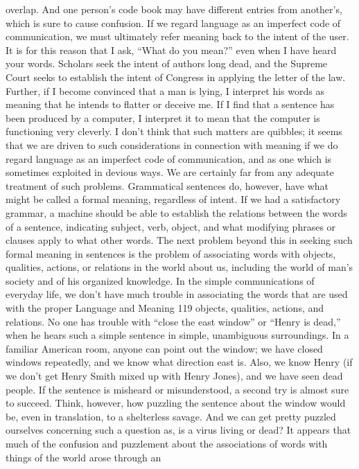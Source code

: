 {{{overlap. And one person’s code book may have different entries
from another’s, which is sure to cause confusion.
If we regard language as an imperfect code of communication,
we must ultimately refer meaning back to the intent of the user.
It is for this reason that I ask, “What do you mean?” even when I
have heard your words. Scholars seek the intent of authors long
dead, and the Supreme Court seeks to establish the intent of Congress
in applying the letter of the law.
Further, if I become convinced that a man is lying, I interpret
his words as meaning that he intends to flatter or deceive me. If I
find that a sentence has been produced by a computer, I interpret
it to mean that the computer is functioning very cleverly.
I don’t think that such matters are quibbles; it seems that we
are driven to such considerations in connection with meaning if
we do regard language as an imperfect code of communication,
and as one which is sometimes exploited in devious ways. We are
certainly far from any adequate treatment of such problems.
Grammatical sentences do, however, have what might be called
a formal meaning, regardless of intent. If we had a satisfactory
grammar, a machine should be able to establish the relations between
the words of a sentence, indicating subject, verb, object, and
what modifying phrases or clauses apply to what other words. The
next problem beyond this in seeking such formal meaning in sentences
is the problem of associating words with objects, qualities,
actions, or relations in the world about us, including the world of
man’s society and of his organized knowledge.
In the simple communications of everyday life, we don’t have
much trouble in associating the words that are used with the proper
Language
and Meaning
119
objects, qualities, actions, and relations. No one has trouble with
“close the east window” or “Henry is dead,” when he hears such
a simple sentence in simple, unambiguous surroundings. In a
familiar American room, anyone can point out the window; we
have closed windows repeatedly, and we know what direction east
is. Also, we know Henry (if we don’t get Henry Smith mixed up
with Henry Jones), and we have seen dead people. If the sentence
is misheard or misunderstood, a second try is almost sure to
succeed.
Think, however, how puzzling the sentence about the window
would be, even in translation, to a shelterless savage. And we can
get pretty puzzled ourselves concerning such a question as, is a
virus living or dead?
It appears that much of the confusion and puzzlement about the
associations of words with things of the world arose through an
}}}
